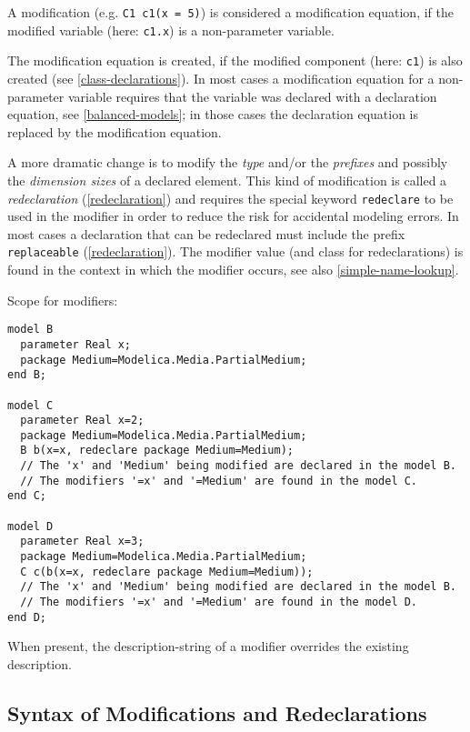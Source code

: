 A modification (e.g. \lstinline!C1 c1(x = 5)!) is considered a modification equation,
if the modified variable (here: \lstinline!c1.x!) is a non-parameter variable.

\begin{nonnormative}
The modification equation is created, if the modified component (here: \lstinline!c1!) is also created (see \autoref{class-declarations}). In most cases
a modification equation for a non-parameter variable requires that the variable was declared with a declaration equation, see \autoref{balanced-models};
in those cases the declaration equation is replaced by the modification equation.
\end{nonnormative}

A more dramatic change is to modify the \emph{type} and/or the
\emph{prefixes} and possibly the \emph{dimension sizes} of a declared
element. This kind of modification is called a \emph{redeclaration}
(\autoref{redeclaration}) and requires the special keyword \lstinline!redeclare! to be used in
the modifier in order to reduce the risk for accidental modeling errors.
In most cases a declaration that can be redeclared must include the
prefix \lstinline!replaceable! (\autoref{redeclaration}). The modifier value (and class for
redeclarations) is found in the context in which the modifier occurs,
see also \autoref{simple-name-lookup}.

\begin{example}
Scope for modifiers:
\begin{lstlisting}[language=modelica]
model B
  parameter Real x;
  package Medium=Modelica.Media.PartialMedium;
end B;

model C
  parameter Real x=2;
  package Medium=Modelica.Media.PartialMedium;
  B b(x=x, redeclare package Medium=Medium);
  // The 'x' and 'Medium' being modified are declared in the model B.
  // The modifiers '=x' and '=Medium' are found in the model C.
end C;

model D
  parameter Real x=3;
  package Medium=Modelica.Media.PartialMedium;
  C c(b(x=x, redeclare package Medium=Medium));
  // The 'x' and 'Medium' being modified are declared in the model B.
  // The modifiers '=x' and '=Medium' are found in the model D.
end D;
\end{lstlisting}
\end{example}

When present, the description-string of a modifier overrides the existing description.

\subsection{Syntax of Modifications and Redeclarations}

